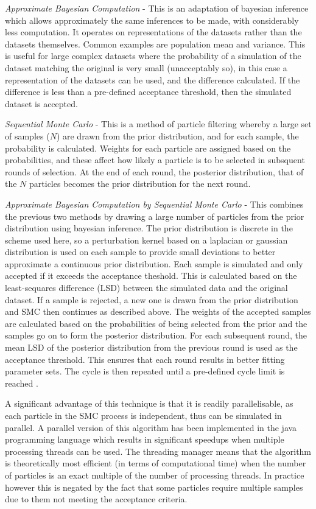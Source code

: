 \textit{Approximate Bayesian Computation} - This is an adaptation of bayesian inference which allows approximately the same inferences to be made, with considerably less computation. It operates on representations of the datasets rather than the datasets themselves. Common examples are population mean and variance. This is useful for large complex datasets where the probability of a simulation of the dataset matching the original is very small (unacceptably so), in this case a representation of the datasets can be used, and the difference calculated. If the difference is less than a pre-defined acceptance threshold, then the simulated dataset is accepted.

\textit{Sequential Monte Carlo} - This is a method of particle filtering whereby a large set of samples ($N$) are drawn from the prior distribution, and for each sample, the probability is calculated. Weights for each particle are assigned based on the probabilities, and these affect how likely a particle is to be selected in subsquent rounds of selection. At the end of each round, the posterior distribution, that of the $N$ particles becomes the prior distribution for the next round.

\textit{Approximate Bayesian Computation by Sequential Monte Carlo} - This combines the previous two methods by drawing a large number of particles from the prior distribution using bayesian inference. The prior distribution is discrete in the scheme used here, so a perturbation kernel based on a laplacian or gaussian distribution is used on each sample to provide small deviations to better approximate a continuous prior distribution. Each sample is simulated and only accepted if it exceeds the acceptance theshold. This is calculated based on the least-sequares difference (LSD) between the simulated data and the original dataset. If a sample is rejected, a new one is drawn from the prior distribution and SMC then continues as described above. The weights of the accepted samples are calculated based on the probabilities of being selected from the prior and the samples go on to form the posterior distribution. For each subsequent round, the mean LSD of the posterior distribution from the previous round is used as the acceptance threshold. This ensures that each round results in better fitting parameter sets. The cycle is then repeated until a pre-defined cycle limit is reached \cite{Toni2009}.

A significant advantage of this technique is that it is readily parallelisable, as each particle in the SMC process is independent, thus can be simulated in parallel. A parallel version of this algorithm has been implemented in the java programming language which results in significant speedups when multiple processing threads can be used. The threading manager means that the algorithm is theoretically most efficient (in terms of computational time) when the number of particles is an exact multiple of the number of processing threads. In practice however this is negated by the fact that some particles require multiple samples due to them not meeting the acceptance criteria.


